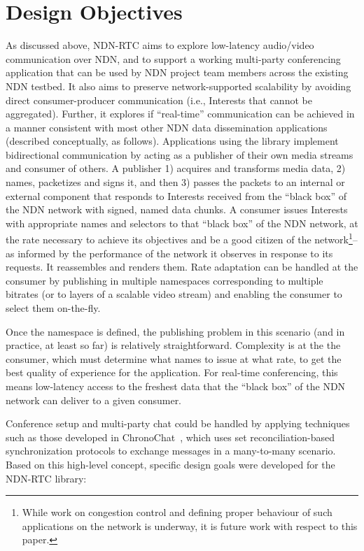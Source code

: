 \documentclass{icn/sig-alternate-2013} %
\newcommand{\ndnrtcName}{NDN-RTC} %
\begin{document}
\section{Design Objectives}
\label{sec:goals}
As discussed above, \ndnrtcName{} aims to explore low-latency audio/video communication over NDN, and to support a working multi-party conferencing application that can be used by NDN project team members across the existing NDN testbed. It also aims to preserve network-supported scalability by avoiding direct consumer-producer communication (i.e., Interests that cannot be aggregated). Further, it explores if ``real-time'' communication can be achieved in a manner consistent with most other NDN data dissemination applications (described conceptually, as follows). 
    Applications using the library implement bidirectional communication by acting as a publisher of their own media streams and consumer of others. A publisher 1) acquires and transforms media data, 2) names, packetizes and signs it, and then 3) passes the packets to an internal or external component that responds to Interests received from the ``black box'' of the NDN network with signed, named data chunks. A consumer issues Interests with appropriate names and selectors to that ``black box'' of the NDN network, at the rate necessary to achieve its objectives and be a good citizen of the network\footnote{While work on congestion control and defining proper behaviour of such applications on the network is underway, it is future work with respect to this paper.}--as informed by the performance of the network it observes in response to its requests. It reassembles and renders them.  Rate adaptation can be handled at the consumer by publishing in multiple namespaces corresponding to multiple bitrates (or to layers of a scalable video stream) and enabling the consumer to select them on-the-fly.

Once the namespace is defined, the publishing problem in this scenario (and in practice, at least so far) is relatively straightforward.  Complexity is at the the consumer, which must determine what names to issue at what rate, to get the best quality of experience for the application.  For real-time conferencing, this means low-latency access to the freshest data that the ``black box'' of the NDN network can deliver to a given consumer.  

Conference setup and multi-party chat could be handled by applying techniques such as those developed in ChronoChat~\cite{chronochat}, which uses set reconciliation-based synchronization protocols to exchange messages in a many-to-many scenario. Based on this high-level concept, specific design goals were developed for the  \ndnrtcName{} library:
\end{document}
